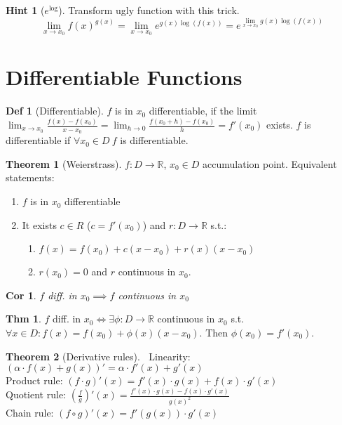 \documentclass[a4paper, 10pt]{article}
\newtheorem*{corollary}{Cor}
\theoremstyle{definition}
\newtheorem*{theorem}{Thm}
\newtheorem*{definition}{Def}
\newtheorem*{note_wrapper}{Hint}
\theoremstyle{ex}
\theoremstyle{named}
\newtheorem*{ntheorem_wrapper}{Theorem}
\newenvironment{ntheorem}%
    {\begin{mdframed}[style=important]\begin{ntheorem_wrapper}}%
    {\end{ntheorem_wrapper}\end{mdframed}}
\newenvironment{note}%
    {\begin{mdframed}[style=trick]\begin{note_wrapper}}%
    {\end{note_wrapper}\end{mdframed}}
\newcommand{\R}{\mathbb{R}}
\begin{document}
\begin{note}[$e^{\log}$] Transform ugly function with this trick.
    $$\lim_{x \to x_0}f(x)^{g(x)} = \lim_{x \to x_0} e^{g(x)\log(f(x))} = e^{\lim\limits_{x \to x_0} g(x)\log(f(x))}$$
\end{note}

\section{Differentiable Functions}

\begin{definition}[Differentiable]
    $f$ is in $x_0$ differentiable, if the limit
    $\lim_{x \to x_0} \frac{f(x) - f(x_0)}{x - x_0} = \lim_{h \to 0} \frac{f(x_0 + h) - f(x_0)}{h} = f'(x_0)$ exists. $f$ is differentiable if $\forall x_0 \in D \ f$ is differentiable. 
\end{definition}

\begin{ntheorem}[Weierstrass]
    $f: D \to \R$, $x_0 \in D$ accumulation point. Equivalent statements:
    \begin{enumerate}
        \item $f$ is in $x_0$ differentiable
        \item It exists $c \in R$ ($c = f'(x_0)$) and $r: D \to \R$ s.t.:
            \begin{enumerate}
                \item $f(x) = f(x_0) + c(x - x_0) + r(x)(x - x_0)$
                \item $r(x_0) = 0$ and $r$ continuous in $x_0$.
            \end{enumerate}
    \end{enumerate}
\end{ntheorem}

\begin{corollary}
    $f$ diff. in $x_0 \implies f$ continuous in $x_0$
\end{corollary}

\begin{theorem}
    $f$ diff. in $x_0 \iff \exists \phi: D \rightarrow \R$ continuous in $x_0$ s.t. $\forall x \in D: f(x) = f(x_0) + \phi(x)(x - x_0)$. Then $\phi(x_0) = f'(x_0)$.
\end{theorem}

\begin{ntheorem}[Derivative rules]$\ $ \newline
    Linearity: $(\alpha \cdot f(x) + g(x))' = \alpha \cdot f'(x) + g'(x)$ \\
    Product rule: $(f \cdot g)'(x) = f'(x)\cdot g(x) + f(x)\cdot g'(x)$ \\
    Quotient rule: $\left(\frac{f}{g}\right)'(x) = \frac{f'(x)\cdot g(x) - f(x)\cdot g'(x)}{g(x)^2}$ \\
    Chain rule: $(f \circ g)'(x) = f'(g(x))\cdot g'(x)$
\end{ntheorem}
\end{document}
